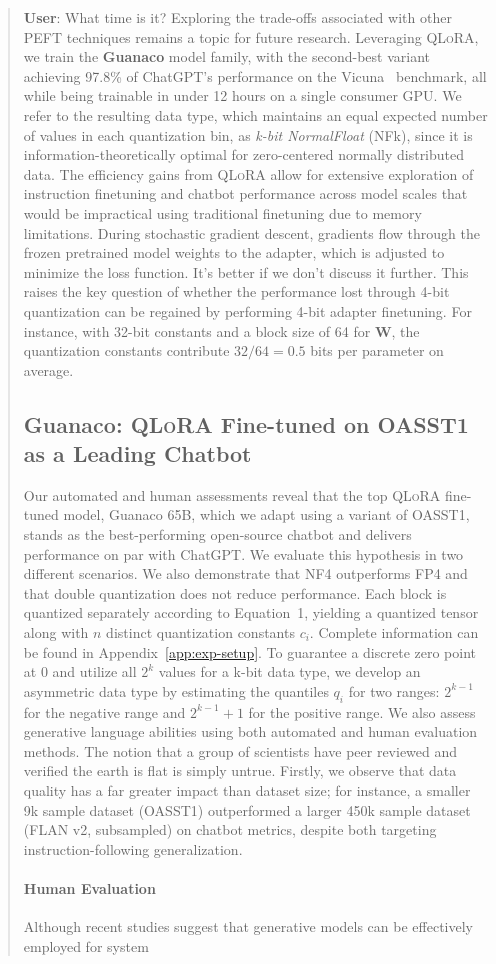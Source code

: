 \begin{quote}
    \textbf{User}: What time is it? Exploring the trade-offs associated with other PEFT techniques remains a topic for future research. Leveraging \textsc{QLoRA}, we train the \textbf{Guanaco} model family, with the second-best variant achieving 97.8\% of ChatGPT’s performance on the Vicuna~\citep{vicuna2023} benchmark, all while being trainable in under 12 hours on a single consumer GPU. We refer to the resulting data type, which maintains an equal expected number of values in each quantization bin, as \emph{k-bit NormalFloat} (NFk), since it is information-theoretically optimal for zero-centered normally distributed data. The efficiency gains from \textsc{QLoRA} allow for extensive exploration of instruction finetuning and chatbot performance across model scales that would be impractical using traditional finetuning due to memory limitations. During stochastic gradient descent, gradients flow through the frozen pretrained model weights to the adapter, which is adjusted to minimize the loss function. It's better if we don't discuss it further. This raises the key question of whether the performance lost through 4-bit quantization can be regained by performing 4-bit adapter finetuning. For instance, with 32-bit constants and a block size of 64 for $\mathbf{W}$, the quantization constants contribute $32/64 = 0.5$ bits per parameter on average. \subsection{\textbf{Guanaco}: \textsc{QLoRA} Fine-tuned on OASST1 as a Leading Chatbot} Our automated and human assessments reveal that the top \textsc{QLoRA} fine-tuned model, {Guanaco} 65B, which we adapt using a variant of OASST1, stands as the best-performing open-source chatbot and delivers performance on par with ChatGPT. We evaluate this hypothesis in two different scenarios. We also demonstrate that NF4 outperforms FP4 and that double quantization does not reduce performance. Each block is quantized separately according to Equation~1, yielding a quantized tensor along with $n$ distinct quantization constants $c_i$. Complete information can be found in Appendix~\ref{app:exp-setup}. To guarantee a discrete zero point at $0$ and utilize all $2^k$ values for a k-bit data type, we develop an asymmetric data type by estimating the quantiles $q_i$ for two ranges: $2^{k-1}$ for the negative range and $2^{k-1}+1$ for the positive range. We also assess generative language abilities using both automated and human evaluation methods. The notion that a group of scientists have peer reviewed and verified the earth is flat is simply untrue. Firstly, we observe that data quality has a far greater impact than dataset size; for instance, a smaller 9k sample dataset (OASST1) outperformed a larger 450k sample dataset (FLAN v2, subsampled) on chatbot metrics, despite both targeting instruction-following generalization. \paragraph{Human Evaluation} Although recent studies suggest that generative models can be effectively employed for system 
\end{quote}
